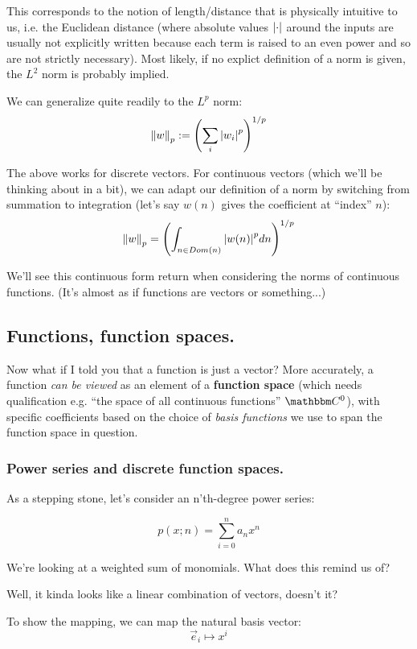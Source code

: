 \documentclass[letterpaper,12pt]{report}
\begin{document}
This corresponds to the notion of
length/distance that is physically intuitive to us,
i.e. the Euclidean distance (where absolute values 
\(\abs{\cdot}\) around the inputs
are usually not explicitly written because each term
is raised to an even power and so are not strictly necessary).
Most likely, if no explict definition of a norm is given,
the \(L^2\) norm is probably implied.\par
We can generalize quite readily to the \(L^p\) norm:
\[\norm{w}_p := \left(\sum_{i} \abs{w_i}^p\right)^{1/p}\]

The above works for discrete vectors. 
For continuous vectors (which we'll be thinking about in a bit),
we can adapt our definition of a norm
by switching from summation to
integration (let's say \(w(n)\) gives the coefficient at
``index'' \(n\)):
\[\norm{w}_p = \left(\int_{n \in Dom(n)} \abs{w(n)}^p dn\right)^{1/p} \]

We'll see this continuous form return when considering
the norms of continuous functions. (It's almost as if
functions are vectors or something...)

\subsection{Functions, function spaces.}

Now what if I told you that a function is just a vector?
More accurately, a function \emph{can be viewed}
as an element of a \textbf{function space} (which needs qualification \textemdash{}
e.g. ``the space of all continuous functions'' \(\domain{C}^0\)), 
with specific coefficients
based on the choice of \emph{basis functions} we use to span the function space in question.

\subsubsection{Power series and discrete function spaces.}


As a stepping stone, let's consider an n'th-degree power series:

\[p(x;n) = \sum_{i=0}^{n}a_n x^n \]

We're looking at a weighted sum of monomials. 
What does this remind us of?\par

Well, it kinda looks like a linear combination of vectors, doesn't it?\par

To show the mapping, we can map the natural basis vector:
\[\vec{e}_i \mapsto x^i \]
\end{document}
